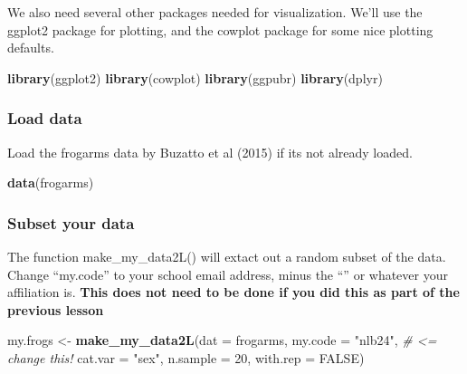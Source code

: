 \documentclass[]{book}
\newenvironment{Shaded}{\begin{snugshade}}{\end{snugshade}}
\newcommand{\KeywordTok}[1]{\textcolor[rgb]{0.13,0.29,0.53}{\textbf{#1}}}
\newcommand{\DataTypeTok}[1]{\textcolor[rgb]{0.13,0.29,0.53}{#1}}
\newcommand{\DecValTok}[1]{\textcolor[rgb]{0.00,0.00,0.81}{#1}}
\newcommand{\StringTok}[1]{\textcolor[rgb]{0.31,0.60,0.02}{#1}}
\newcommand{\CommentTok}[1]{\textcolor[rgb]{0.56,0.35,0.01}{\textit{#1}}}
\newcommand{\OtherTok}[1]{\textcolor[rgb]{0.56,0.35,0.01}{#1}}
\newcommand{\NormalTok}[1]{#1}
\theoremstyle{definition}
\theoremstyle{definition}
\theoremstyle{definition}
\theoremstyle{remark}
\begin{document}
We also need several other packages needed for visualization. We'll use
the ggplot2 package for plotting, and the cowplot package for some nice
plotting defaults.

\begin{Shaded}
\begin{Highlighting}[]
\KeywordTok{library}\NormalTok{(ggplot2)}
\KeywordTok{library}\NormalTok{(cowplot)}
\KeywordTok{library}\NormalTok{(ggpubr)}
\KeywordTok{library}\NormalTok{(dplyr)}
\end{Highlighting}
\end{Shaded}

\subsubsection{Load data}\label{load-data-2}

Load the frogarms data by Buzatto et al (2015) if its not already
loaded.

\begin{Shaded}
\begin{Highlighting}[]
\KeywordTok{data}\NormalTok{(frogarms)}
\end{Highlighting}
\end{Shaded}

\subsubsection{Subset your data}\label{subset-your-data-2}

The function make\_my\_data2L() will extact out a random subset of the
data. Change ``my.code'' to your school email address, minus the
``\citet{pitt.edu}'' or whatever your affiliation is. \textbf{This does
not need to be done if you did this as part of the previous lesson}

\begin{Shaded}
\begin{Highlighting}[]
\NormalTok{my.frogs <-}\StringTok{ }\KeywordTok{make_my_data2L}\NormalTok{(}\DataTypeTok{dat =}\NormalTok{ frogarms, }
                           \DataTypeTok{my.code =} \StringTok{"nlb24"}\NormalTok{, }\CommentTok{# <=  change this!}
                           \DataTypeTok{cat.var =} \StringTok{"sex"}\NormalTok{,}
                           \DataTypeTok{n.sample =} \DecValTok{20}\NormalTok{, }
                           \DataTypeTok{with.rep =} \OtherTok{FALSE}\NormalTok{)}
\end{Highlighting}
\end{Shaded}
\end{document}
